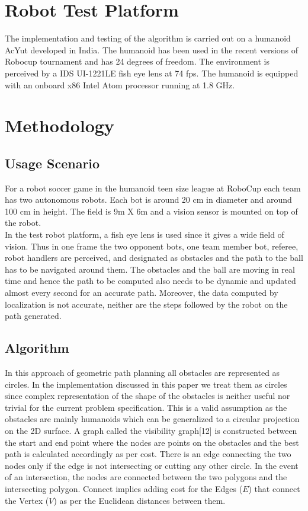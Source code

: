 \documentclass[letterpaper, 10 pt, conference]{ieeeconf}  %
\begin{document}
\section{Robot Test Platform}
The implementation and testing of the algorithm is carried out on a humanoid AcYut developed in India. The humanoid has been used in the recent versions of Robocup tournament and has 24 degrees of freedom. The environment is perceived by a IDS UI-1221LE fish eye lens at 74 fps. The humanoid is equipped with an onboard x86 Intel Atom processor running at 1.8 GHz.

\section{Methodology}
\subsection{Usage Scenario}
For a robot soccer game in the humanoid teen size league at RoboCup each team has two autonomous robots. Each bot is around 20 cm in diameter and around 100 cm in height. The field is 9m X 6m and a vision sensor is mounted on top of the robot. \\
In the test robot platform, a fish eye lens is used since it gives a wide field of vision. Thus in one frame the two opponent bots, one team member bot,
referee, robot handlers are perceived, and designated as obstacles and the path to the ball has to be navigated around them. The obstacles and the ball are moving in real time and hence the path to be computed also needs to be dynamic and updated almost every second for an accurate path. Moreover, the data computed by localization is not accurate, neither are the steps followed by the robot on the path generated.

\subsection{Algorithm}
In this approach of geometric path planning all obstacles are represented as circles. In the implementation discussed in this paper we treat them as circles since complex representation of the shape of the obstacles is neither useful nor trivial for the current problem specification. This is a valid assumption as the obstacles are mainly humanoids which can be generalized to a circular projection on the 2D surface. A graph called the visibility graph[12] is constructed between the start and end point where the nodes are points on the obstacles and the best path is calculated accordingly as per cost. There is an edge connecting the two nodes only if the edge is not intersecting or cutting any other circle. In the event of an intersection, the nodes
are connected between the two polygons and the intersecting polygon. Connect implies adding cost for the Edges ($E$) that connect the Vertex ($V$) as per the Euclidean distances between them.
\end{document}
